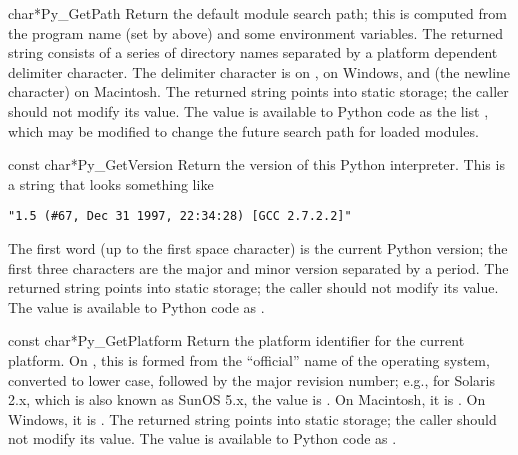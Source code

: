 \begin{cfuncdesc}{char*}{Py_GetPath}{}
  Return the default module search path; this is computed from the 
  program name (set by  above) and some
  environment variables.  The returned string consists of a series of
  directory names separated by a platform dependent delimiter
  character.  The delimiter character is \character{:} on \UNIX,
  \character{;} on Windows, and  (the \ASCII{}
  newline character) on Macintosh.  The returned string points into
  static storage; the caller should not modify its value.  The value
  is available to Python code as the list
  , which
  may be modified to change the future search path for loaded
  modules.

\end{cfuncdesc}

\begin{cfuncdesc}{const char*}{Py_GetVersion}{}
  Return the version of this Python interpreter.  This is a string
  that looks something like

\begin{verbatim}
"1.5 (#67, Dec 31 1997, 22:34:28) [GCC 2.7.2.2]"
\end{verbatim}

  The first word (up to the first space character) is the current
  Python version; the first three characters are the major and minor
  version separated by a period.  The returned string points into
  static storage; the caller should not modify its value.  The value
  is available to Python code as .
\end{cfuncdesc}

\begin{cfuncdesc}{const char*}{Py_GetPlatform}{}
  Return the platform identifier for the current platform.  On \UNIX,
  this is formed from the ``official'' name of the operating system,
  converted to lower case, followed by the major revision number;
  e.g., for Solaris 2.x, which is also known as SunOS 5.x, the value
  is .  On Macintosh, it is .  On Windows,
  it is .  The returned string points into static storage;
  the caller should not modify its value.  The value is available to
  Python code as .
\end{cfuncdesc}

